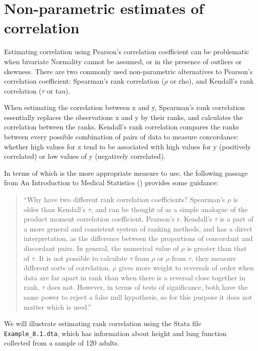 \documentclass[
]{memoir}
\begin{document}
\hypertarget{non-parametric-estimates-of-correlation}{%
\section{Non-parametric estimates of correlation}\label{non-parametric-estimates-of-correlation}}

Estimating correlation using Pearson's correlation coefficient can be problematic when bivariate Normality cannot be assumed, or in the presence of outliers or skewness. There are two commonly used non-parametric alternatives to Pearson's correlation coefficient: Spearman's rank correlation (\(\rho\) or rho), and Kendall's rank correlation (\(\tau\) or tau).

When estimating the correlation between x and y, Spearman's rank correlation essentially replaces the observations x and y by their ranks, and calculates the correlation between the ranks. Kendall's rank correlation compares the ranks between every possible combination of pairs of data to measure concordance: whether high values for x tend to be associated with high values for y (positively correlated) or low values of y (negatively correlated).

In terms of which is the more appropriate measure to use, the following passage from An Introduction to Medical Statistics (\citet{bland15}) provides some guidance:

\begin{quote}
``Why have two different rank correlation coefficients? Spearman's \(\rho\) is older than Kendall's \(\tau\), and can be thought of as a simple analogue of the product moment correlation coefficient, Pearson's r. Kendall's \(\tau\) is a part of a more general and consistent system of ranking methods, and has a direct interpretation, as the difference between the proportions of concordant and discordant pairs. In general, the numerical value of \(\rho\) is greater than that of \(\tau\). It is not possible to calculate \(\tau\) from \(\rho\) or \(\rho\) from \(\tau\), they measure different sorts of correlation. \(\rho\) gives more weight to reversals of order when data are far apart in rank than when there is a reversal close together in rank, \(\tau\) does not. However, in terms of tests of significance, both have the same power to reject a false null hypothesis, so for this purpose it does not matter which is used.''
\end{quote}

We will illustrate estimating rank correlation using the Stata file \texttt{Example\_8.1.dta}, which has information about height and lung function collected from a sample of 120 adults.
\end{document}
